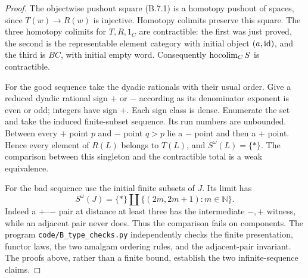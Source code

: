 \begin{proof}
The objectwise pushout square (B.7.1) is a homotopy pushout of
spaces, since $T(w)\to R(w)$ is injective. Homotopy colimits
preserve this square. The three homotopy colimits for $T,R,1_C$
are contractible: the first was just proved, the second is the
representable element category with initial object $(a,\mathrm{id})$,
and the third is $BC$, with initial empty word. Consequently
$\operatorname*{hocolim}_C S$ is contractible.

For the good sequence take the dyadic rationals with their usual
order. Give a reduced dyadic rational sign $+$ or $-$ according
as its denominator exponent is even or odd; integers have sign
$+$. Each sign class is dense. Enumerate the set and take the
induced finite-subset sequence. Its run numbers are unbounded.
Between every $+$ point $p$ and $-$ point $q>p$ lie a $-$ point
and then a $+$ point. Hence every element of $R(L)$ belongs
to $T(L)$, and $S^\omega(L)=\{*\}$. The comparison between
this singleton and the contractible total is a weak equivalence.

For the bad sequence use the initial finite subsets of $J$.
Its limit has
\[
 S^\omega(J)=\{*\}\amalg
       \{(2m,2m+1):m\in\mathbb N\}.
\]
Indeed a $+$--$-$ pair at distance at least three has the
intermediate $-,+$ witness, while an adjacent pair never does.
Thus the comparison fails on components. The program
\texttt{code/B\_type\_checks.py} independently checks the
finite presentation, functor laws, the two amalgam ordering
rules, and the adjacent-pair invariant. The proofs above, rather
than a finite bound, establish the two infinite-sequence claims.
\end{proof}

